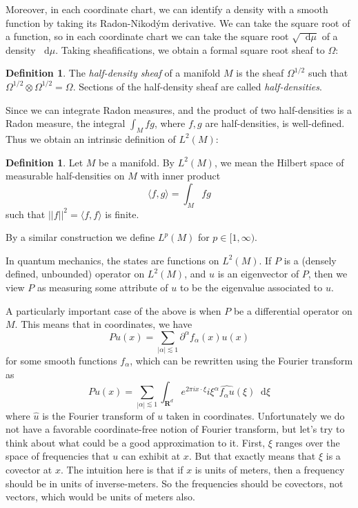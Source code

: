 \documentclass[reqno,12pt,letterpaper]{amsart}
\newcommand{\RR}{\mathbf{R}}
\newcommand*\dif{\mathop{}\!\mathrm{d}}
\newcommand{\dfn}[1]{\emph{#1}\index{#1}}
\theoremstyle{definition}
\newtheorem{definition}[theorem]{Definition}
\numberwithin{equation}{section}
\begin{document}
Moreover, in each coordinate chart, we can identify a density with a smooth function by taking its Radon-Nikod\'ym derivative.
We can take the square root of a function, so in each coordinate chart we can take the square root $\sqrt{\dif \mu}$ of a density $\dif \mu$.
Taking sheafifications, we obtain a formal square root sheaf to $\Omega$:

\begin{definition}
The \dfn{half-density sheaf} of a manifold $M$ is the sheaf $\Omega^{1/2}$ such that $\Omega^{1/2} \otimes \Omega^{1/2} = \Omega$.
Sections of the half-density sheaf are called \dfn{half-densities}.
\end{definition}

Since we can integrate Radon measures, and the product of two half-densities is a Radon measure, the integral $\int_M fg$, where $f,g$ are half-densities, is well-defined.
Thus we obtain an intrinsic definition of $L^2(M)$:

\begin{definition}
Let $M$ be a manifold. By $L^2(M)$, we mean the Hilbert space of measurable half-densities on $M$ with inner product 
$$\langle f, g\rangle = \int_M fg$$
such that $||f||^2 = \langle f, f\rangle$ is finite.
\end{definition}

By a similar construction we define $L^p(M)$ for $p \in [1, \infty)$.

In quantum mechanics, the states are functions on $L^2(M)$.
If $P$ is a (densely defined, unbounded) operator on $L^2(M)$, and $u$ is an eigenvector of $P$, then we view $P$ as measuring some attribute of $u$ to be the eigenvalue associated to $u$.

A particularly important case of the above is when $P$ be a differential operator on $M$.
This means that in coordinates, we have 
$$Pu(x) = \sum_{|\alpha| \lesssim 1}\partial^\alpha f_\alpha(x) u(x)$$
for some smooth functions $f_\alpha$, which can be rewritten using the Fourier transform as 
$$Pu(x) = \sum_{|\alpha| \lesssim 1} \int_{\RR^d} e^{2\pi ix\cdot \xi} i\xi^\alpha \widehat{f_\alpha u}(\xi) \dif \xi$$
where $\hat u$ is the Fourier transform of $u$ taken in coordinates.
Unfortunately we do not have a favorable coordinate-free notion of Fourier transform, but let's try to think about what could be a good approximation to it.
First, $\xi$ ranges over the space of frequencies that $u$ can exhibit at $x$.
But that exactly means that $\xi$ is a covector at $x$.
The intuition here is that if $x$ is units of meters, then a frequency should be in units of inverse-meters. So the frequencies should be covectors, not vectors, which would be units of meters also.
\end{document}
